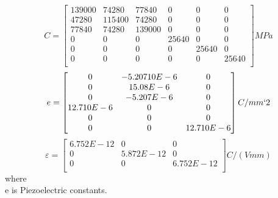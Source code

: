 \documentclass[11pt]{article}
\begin{document}
$$
C = \begin{bmatrix}
139000 & 74280 & 77840 & 0 & 0 & 0\\
47280 & 115400 & 74280 & 0 & 0 & 0\\
77840 & 74280 & 139000 & 0 & 0 & 0\\
0 & 0 & 0 & 25640 & 0 & 0\\
0 & 0 & 0 & 0 & 25640 & 0\\
0 & 0 & 0 & 0 & 0 & 25640\\
\end{bmatrix} MPa
$$  
$$
e = \begin{bmatrix}
0 & -5.20710E-6 & 0 \\
0 & 15.08E-6 & 0 \\
0 & -5.207E-6 & 0\\
12.710E-6 & 0 & 0 \\
0 & 0 & 0 \\
0 & 0 & 12.710E-6 \\
\end{bmatrix} C/ mm`2
$$
$$
\varepsilon = \begin{bmatrix}
6.752E-12 & 0 & 0 \\
0 & 5.872E-12 & 0 \\
0 & 0 & 6.752E-12\\
\end{bmatrix} C/(V mm)
$$
where \\
e is Piezoelectric constants.








\noindent

 
\end{document}
